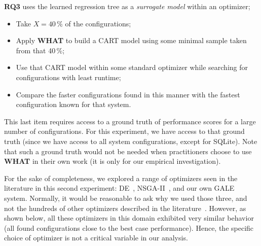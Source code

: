 \documentclass{newsig}
\newcommand{\bi}{\begin{itemize}}%
\newcommand{\ei}{\end{itemize}}
\newcommand{\what}{{\bf WHAT }}
\begin{document}
{\bf RQ3}   uses the learned regression tree as a {\em surrogate model} within an optimizer; 
\bi
\item Take   $X=40\,\%$ of the configurations;
\item Apply \what to build a CART model using some minimal sample taken from that 40\,\%;
\item Use that CART model within some standard optimizer while searching for 
configurations with least runtime;
\item  Compare the faster configurations found in this manner with the fastest configuration
known for that system.
\ei
This last item requires access to a ground truth of performance scores for a  
large number of configurations. For this experiment, we have access to that ground truth
(since we have access to all system configurations, except for SQLite). Note that such a ground truth
would not be needed when practitioners choose to use \what in their own work (it is only for our empirical investigation).


For the sake of completeness, we explored
a range of optimizers seen in the   literature in this second experiment:  DE~\cite{storn1997differential}, NSGA-II~\cite{deb00afast},
and our own GALE~\cite{krall2014gale,zuluaga2013active} system.   Normally,
it would be  reasonable to ask
why we used those three, and not the hundreds of other 
optimizers described in the literature~\cite{fletcher13,harman12}. However,
as shown below, all these optimizers in this
domain exhibited  very similar
behavior (all found configurations close to the
best case performance). Hence, the specific
choice of optimizer is not a critical
variable in  our analysis.
\end{document}
